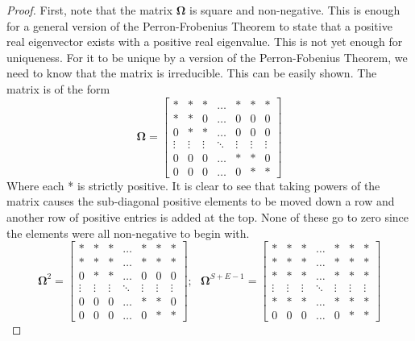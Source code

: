   \begin{proof}
    First, note that the matrix $\bm{\Omega}$ is square and non-negative.  This is enough for a general version of the Perron-Frobenius Theorem to state that a positive real eigenvector exists with a positive real eigenvalue. This is not yet enough for uniqueness. For it to be unique by a version of the Perron-Fobenius Theorem, we need to know that the matrix is irreducible. This can be easily shown. The matrix is of the form
    $$\bm{\Omega} =
    \begin{bmatrix}
      * & *  & * & \hdots & * & * & *\\
      * & * & 0 & \hdots & 0 & 0 & 0 \\
      0 & * & * & \hdots & 0 & 0 & 0 \\
      \vdots & \vdots & \vdots & \ddots & \vdots & \vdots & \vdots \\
      0 & 0 & 0 & \hdots & *  & * & 0 \\
      0 & 0 & 0 & \hdots & 0 & * & *
    \end{bmatrix}
    $$
    Where each * is strictly positive. It is clear to see that taking powers of the matrix causes the sub-diagonal positive elements to be moved down a row and another row of positive entries is added at the top. None of these go to zero since the elements were all non-negative to begin with.
    $$\bm{\Omega}^2 =
    \begin{bmatrix}
      * & *  & * & \hdots & * & * & *\\
      * & * & * & \hdots & * & * & * \\
      0 & * & * & \hdots & 0 & 0 & 0 \\
      \vdots & \vdots & \vdots & \ddots & \vdots & \vdots & \vdots \\
      0 & 0 & 0 & \hdots & *  & * & 0 \\
      0 & 0 & 0 & \hdots & 0 & * & *
    \end{bmatrix}; ~~~
    \bm{\Omega}^{S+E-1} =
    \begin{bmatrix}
      * & *  & * & \hdots & * & * & *\\
      * & * & * & \hdots & * & * & * \\
      * & * & * & \hdots & * & * & * \\
      \vdots & \vdots & \vdots & \ddots & \vdots & \vdots & \vdots \\
      * & * & * & \hdots & *  & * & * \\
      0 & 0 & 0 & \hdots & 0 & * & *
    \end{bmatrix}
$$
\end{proof}
